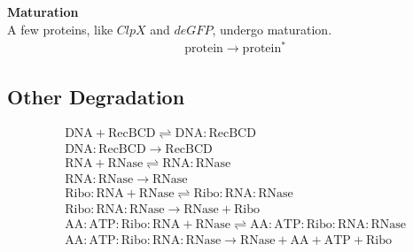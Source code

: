 \noindent \textbf{Maturation}\\
A few proteins, like $ClpX$ and $deGFP$, undergo maturation. 
\begin{align}
& \mathrm{protein}  \rightarrow \mathrm{protein^*}
\end{align}
\subsection{Other Degradation}

\begin{align}
& \mathrm{DNA} + \mathrm{RecBCD} \rightleftharpoons \mathrm{DNA}\!:\!\mathrm{RecBCD} \\
& \mathrm{DNA}\!:\!\mathrm{RecBCD} \rightarrow \mathrm{RecBCD} \\
& \mathrm{RNA} + \mathrm{RNase} \rightleftharpoons \mathrm{RNA}\!:\!\mathrm{RNase} \\
& \mathrm{RNA}\!:\!\mathrm{RNase} \rightarrow \mathrm{RNase} \\
& \mathrm{Ribo}\!:\!\mathrm{RNA} + \mathrm{RNase} \rightleftharpoons \mathrm{Ribo}\!:\!\mathrm{RNA}\!:\!\mathrm{RNase} \\
& \mathrm{Ribo}\!:\!\mathrm{RNA}\!:\!\mathrm{RNase} \rightarrow \mathrm{RNase} + \mathrm{Ribo} \\
& \mathrm{AA}\!:\!\mathrm{ATP}\!:\!\mathrm{Ribo}\!:\!\mathrm{RNA} + \mathrm{RNase} \rightleftharpoons \mathrm{AA}\!:\!\mathrm{ATP}\!:\!\mathrm{Ribo}\!:\!\mathrm{RNA}\!:\!\mathrm{RNase} \\
&\mathrm{AA}\!:\!\mathrm{ATP}\!:\!\mathrm{Ribo}\!:\!\mathrm{RNA}\!:\!\mathrm{RNase} \rightarrow \mathrm{RNase} + \mathrm{AA} + \mathrm{ATP} + \mathrm{Ribo} 
\end{align}
